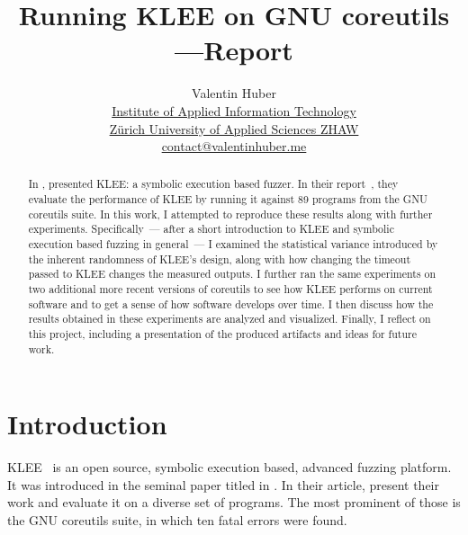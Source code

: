 \documentclass{article}
\title{Running KLEE on GNU coreutils\break—\break Report\vspace{2em}}
\let\savedCite=\cite
\renewcommand{\cite}{\unskip~\savedCite}
\begin{document}
\author{%
    Valentin Huber\vspace{5px}\\%
    \small \href{https://www.zhaw.ch/en/engineering/institutes-centres/init/}{Institute of Applied Information Technology}\\%
    \small \href{https://www.zhaw.ch/en}{Zürich University of Applied Sciences ZHAW}\\%
    \small \href{mailto://contact@valentinhuber.me}{contact@valentinhuber.me}%
    \vspace{10px}
}

\maketitle

\begin{abstract}
    In \citeyear{KLEE}, \citeauthor{KLEE} presented KLEE: a symbolic execution based fuzzer. In their report\cite{KLEE}, they evaluate the performance of KLEE by running it against 89 programs from the GNU coreutils suite. In this work, I attempted to reproduce these results along with further experiments. Specifically~— after a short introduction to KLEE and symbolic execution based fuzzing in general~— I examined the statistical variance introduced by the inherent randomness of KLEE's design, along with how changing the timeout passed to KLEE changes the measured outputs. I further ran the same experiments on two additional more recent versions of coreutils to see how KLEE performs on current software and to get a sense of how software develops over time. I then discuss how the results obtained in these experiments are analyzed and visualized. Finally, I reflect on this project, including a presentation of the produced artifacts and ideas for future work.
\end{abstract}

\clearpage\newpage
\tableofcontents
\clearpage\newpage

\section{Introduction}
\label{Introduction}
KLEE\cite{KLEEWebsite} is an open source, symbolic execution based, advanced fuzzing platform. It was introduced in the seminal paper titled  in \citeyear{KLEE}. In their article, \citeauthor{KLEE} present their work and evaluate it on a diverse set of programs. The most prominent of those is the GNU coreutils suite, in which ten fatal errors were found.
\end{document}
